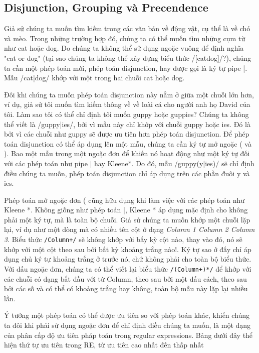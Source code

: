 \subsection{Disjunction, Grouping và Precendence}

Giả sử chúng ta muốn tìm kiếm trong các văn bản về động vật, cụ thể là về chó và mèo. Trong những trường hợp đó, chúng ta có thể muốn tìm những cụm từ như cat hoặc dog. Do chúng ta không thể sử dụng ngoặc vuông để định nghĩa "cat or dog" (tại sao chúng ta không thể xây dựng biểu thức /[catdog]/?), chúng ta cần một phép toán mới, phép toán disjunction, hay được gọi là ký tự pipe \verb|||. Mẫu /cat|dog/ khớp với một trong hai chuỗi cat hoặc dog.

Đôi khi chúng ta muốn phép toán disjunction này nằm ở giữa một chuỗi lớn hơn, ví dụ, giả sử tôi muốn tìm kiếm thông về về loài cá cho người anh họ David của tôi. Làm sao tôi có thể chỉ định tôi muốn guppy hoặc guppies? Chúng ta không thể viết là /guppy|ies/, bởi vì mẫu này chỉ khớp với chuỗi guppy hoặc ies. Đó là bởi vì các chuỗi như guppy sẽ được ưu tiên hơn phép toán disjunction. Để phép toán disjunction có thể áp dụng lên một mẫu, chúng ta cần ký tự mở ngoặc ( và ). Bao một mẫu trong một ngoặc đơn để khiến nó hoạt động như một ký tự đối với các phép toán như pipe | hay Kleene*. Do đó, mẫu /guppy(y|ies)/ sẽ chỉ định điều chúng ta muốn, phép toán disjunction chỉ áp dụng trên các phần đuôi y và ies.

Phép toán mở ngoặc đơn ( cũng hữu dụng khi làm việc với các phép toán như Kleene *. Không giống như phép toán |, Kleene * áp dụng mặc định cho không phải một ký tự, mà là toàn bộ chuỗi. Giả sử chúng ta muốn khớp một chuỗi lặp lại, ví dụ như một dòng mà có nhiều tên cột ở dạng \textit{Column 1 \hspace{0.1em} Column 2 \hspace{0.1em} Column 3}. Biểu thức \texttt{/Column\textvisiblespace[0-9]+\textvisiblespace*/} sẽ không khớp với bấy kỳ cột nào, thay vào đó, nó sẽ khớp với một cột theo sau bởi bất kỳ khoảng trắng nào!. Ký tự sao ở đấy chỉ áp dụng chủ ký tự khoảng trắng ở trước nó, chứ không phải cho toàn bộ biểu thức. Với dấu ngoặc đơn, chúng ta có thể viết lại biểu thức \texttt{/(Column\textvisiblespace[0-9]+\textvisiblespace*)*/} để khớp với các chuỗi có dạng bắt đầu với từ Column, theo sau bởi một dấu cách, theo sau bởi các số và có thể có khoảng trắng hay không, toàn bộ mẫu này lặp lại nhiều lần.

Ý tưởng một phép toán có thể được ưu tiên so với phép toán khác, khiến chúng ta đôi khi phải sử dụng ngoặc đơn để chỉ định điều chúng ta muốn, là một dạng của phân cấp độ ưu tiên pháp toán trong regular expressions. Bảng dưới đây thể hiện thứ tự ưu tiên trong RE, từ ưu tiên cao nhất đến thấp nhất

